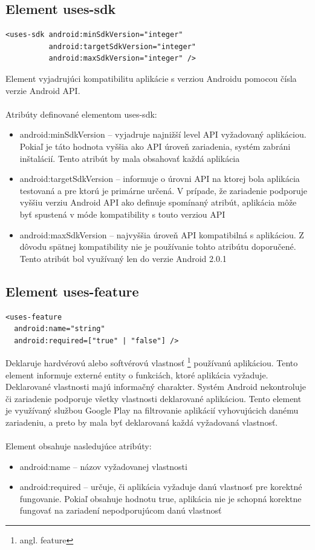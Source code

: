 \subsection{Element uses-sdk}
\lstset{language=XML}
\begin{lstlisting}
<uses-sdk android:minSdkVersion="integer"
          android:targetSdkVersion="integer"
          android:maxSdkVersion="integer" />
\end{lstlisting}
Element vyjadrujúci kompatibilitu aplikácie s verziou Androidu pomocou čísla verzie Android API.\\\\
Atribúty definované elementom uses-sdk:\\
\begin{itemize}
\item android:minSdkVersion – vyjadruje najnižší level API vyžadovaný aplikáciou. Pokiaľ je táto hodnota vyššia ako API úroveň zariadenia, systém zabráni inštalácií. Tento atribút by mala obsahovať každá aplikácia
\item android:targetSdkVersion – informuje o úrovni API na ktorej bola aplikácia testovaná a pre ktorú je primárne určená. V prípade, že zariadenie podporuje vyššiu verziu Android API ako definuje spomínaný atribút, aplikácia môže byť spustená v móde kompatibility s touto verziou API 
\item android:maxSdkVersion – najvyššia úroveň API kompatibilná s aplikáciou. Z dôvodu spätnej kompatibility nie je používanie tohto atribútu doporučené. Tento atribút bol využívaný len do verzie Android 2.0.1
\end{itemize}

\subsection{Element uses-feature}
\lstset{language=XML}
\begin{lstlisting}
<uses-feature
  android:name="string"
  android:required=["true" | "false"] />
\end{lstlisting}
Deklaruje hardvérovú alebo softvérovú vlastnosť \footnote{angl. feature} používanú aplikáciou. Tento element informuje externé entity o funkciách, ktoré aplikácia vyžaduje. Deklarované vlastnosti majú informačný charakter. Systém Android nekontroluje či zariadenie podporuje všetky vlastnosti deklarované aplikáciou. Tento element je využívaný službou Google Play na  filtrovanie aplikácií vyhovujúcich danému zariadeniu, a preto by mala byť deklarovaná každá vyžadovaná vlastnosť.\\\\ Element obsahuje nasledujúce atribúty:\\
\begin{itemize}
\item android:name – názov vyžadovanej vlastnosti
\item android:required – určuje, či aplikácia vyžaduje danú vlastnosť pre korektné fungovanie. Pokiaľ obsahuje hodnotu true, aplikácia nie je schopná korektne fungovať na zariadení nepodporujúcom danú vlastnosť
\end{itemize}

